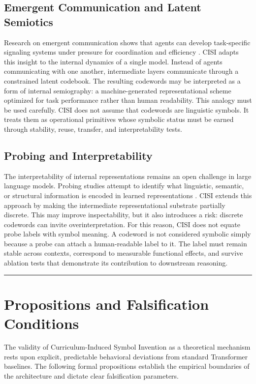 \section{Emergent Communication and Latent Semiotics}
Research on emergent communication shows that agents can develop task-specific signaling systems under pressure for coordination and efficiency \cite{Foerster2016}. CISI adapts this insight to the internal dynamics of a single model. Instead of agents communicating with one another, intermediate layers communicate through a constrained latent codebook. The resulting codewords may be interpreted as a form of internal semiography: a machine-generated representational scheme optimized for task performance rather than human readability.
This analogy must be used carefully. CISI does not assume that codewords are linguistic symbols. It treats them as operational primitives whose symbolic status must be earned through stability, reuse, transfer, and interpretability tests.
\section{Probing and Interpretability}
The interpretability of internal representations remains an open challenge in large language models. Probing studies attempt to identify what linguistic, semantic, or structural information is encoded in learned representations \cite{Rogers2020}. CISI extends this approach by making the intermediate representational substrate partially discrete. This may improve inspectability, but it also introduces a risk: discrete codewords can invite overinterpretation.
For this reason, CISI does not equate probe labels with symbol meaning. A codeword is not considered symbolic simply because a probe can attach a human-readable label to it. The label must remain stable across contexts, correspond to measurable functional effects, and survive ablation tests that demonstrate its contribution to downstream reasoning.

\vspace{2em}
\hrule
\vspace{2em}

\chapter{Propositions and Falsification Conditions}

The validity of Curriculum-Induced Symbol Invention as a theoretical mechanism rests upon explicit, predictable behavioral deviations from standard Transformer baselines. The following formal propositions establish the empirical boundaries of the architecture and dictate clear falsification parameters.


